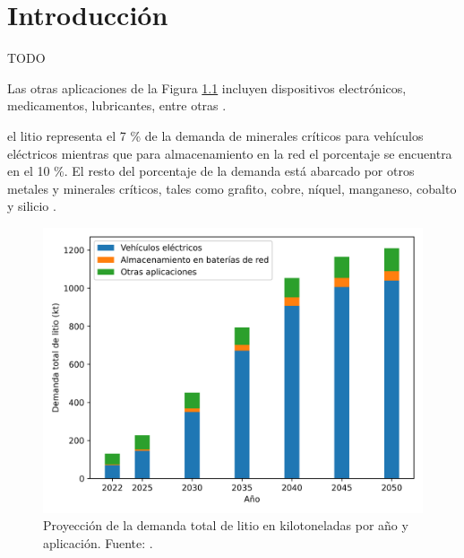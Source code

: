 \chapter{Introducción}\label{ch:introduccion}
\thispagestyle{empty}

\vspace{50pt}

\begin{adjustwidth}{50pt}{50pt}
    TODO
\end{adjustwidth}

\clearpage
\newpage
\thispagestyle{empty}
\mbox{}
\newpage



Las otras aplicaciones de la Figura \ref{fig:iea-Li} incluyen dispositivos
electrónicos, medicamentos, lubricantes, entre otras \cite{IEA}.

 el litio representa el 7 \% de la demanda de minerales críticos
para vehículos eléctricos mientras que para almacenamiento en la red el porcentaje
se encuentra en el 10 \%. El resto del porcentaje de la demanda está abarcado por 
otros metales y minerales críticos, tales como grafito, cobre, níquel, manganeso, 
cobalto y silicio \cite{IEA}.

\begin{figure}[h!]
    \centering
    \includegraphics[width=.8\textwidth]{Introduccion/iea-Li.png}
    \caption{Proyección de la demanda total de litio en kilotoneladas por año y 
    aplicación. Fuente: \cite{IEA}.}
    \label{fig:iea-Li}
\end{figure}

